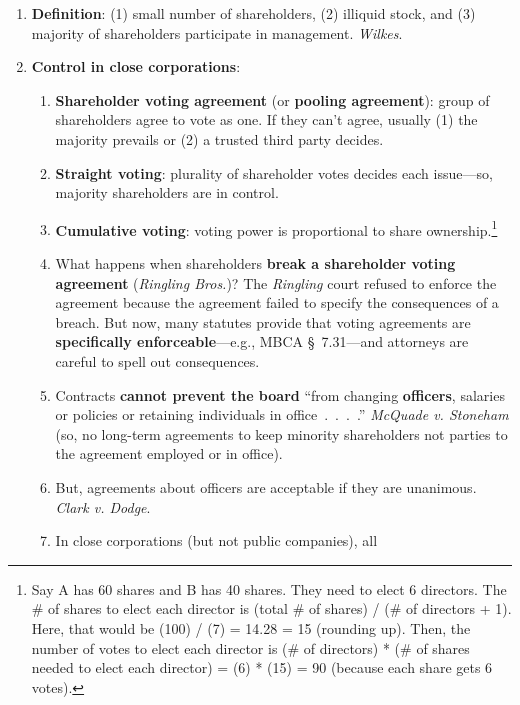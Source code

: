 \begin{enumerate}
    \item \textbf{Definition}: (1) small number of shareholders, (2) illiquid 
    stock, and (3) majority of shareholders participate in management. 
    \emph{Wilkes}.
    \item \textbf{Control in close corporations}:
    \begin{enumerate}
        \item \textbf{Shareholder voting agreement} (or \textbf{pooling 
        agreement}): group of shareholders agree to vote as one. If they can't 
        agree, usually (1) the majority prevails or (2) a trusted third party 
        decides.
        \item \textbf{Straight voting}: plurality of shareholder votes 
        decides each issue---so, majority shareholders are in control.
        \item \textbf{Cumulative voting}: voting power is proportional to 
        share ownership.\footnote{Say A has 60 shares and B has 40 shares. 
        They need to elect 6 directors. The \# of shares to elect each 
        director is (total \# of shares) / (\# of directors + 1). Here, that 
        would be (100) / (7) = 14.28 = 15 (rounding up).
        Then, the number of votes to elect each director is (\# of directors) 
        * (\# of shares needed to elect each director) = (6) * (15) = 90 
        (because each share gets 6 votes).}
        \item What happens when shareholders \textbf{break a shareholder 
        voting agreement} (\emph{Ringling Bros.})? The \emph{Ringling} court 
        refused to enforce the agreement because the agreement failed to 
        specify the consequences of a breach. But now, many statutes provide 
        that voting agreements are \textbf{specifically enforceable}---e.g., 
        MBCA \S\ 7.31---and attorneys are careful to spell out consequences.
        \item Contracts \textbf{cannot prevent the board} ``from changing 
        \textbf{officers}, salaries or policies or retaining individuals in 
        office~.~.~.~.'' \emph{McQuade v. Stoneham} (so, no long-term 
        agreements to keep minority shareholders not parties to the agreement 
        employed or in office).
        \item But, agreements about officers are acceptable if they are 
        unanimous. \emph{Clark v. Dodge}.
        \item In close corporations (but not public companies), all 

\end{enumerate}
\end{enumerate}

